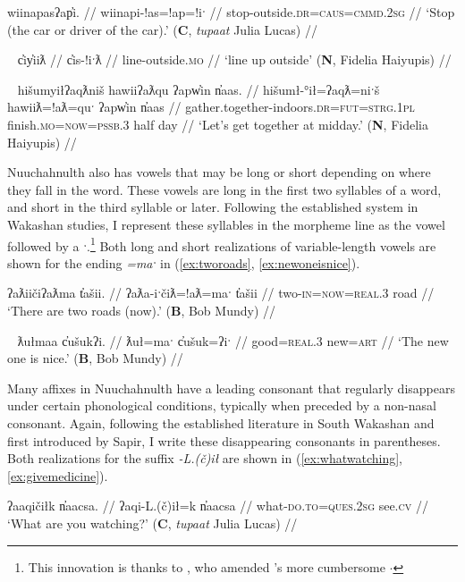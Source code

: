 \ex \label{ex:stopoutside}
\begingl
\glpreamble wiinapasʔap̓i. //
\gla wiinapi-!as=!ap=!iˑ //
\glb stop-outside.\textsc{dr}=\textsc{caus}=\textsc{cmmd.2sg} //
\glft `Stop (the car or driver of the car).' (\textbf{C}, \textit{tupaat} Julia Lucas) //
\endgl
\xe

\ex~ \label{ex:lineupoutside}
\begingl
\glpreamble c̓iy̓iiƛ //
\gla c̓is-!iˑƛ //
\glb line-outside.\textsc{mo} //
\glft `line up outside' (\textbf{N}, Fidelia Haiyupis) //
\endgl
\xe

\ex~ \label{ex:gatherindoors}
\begingl
\glpreamble hišumyiłʔaqƛniš hawiiʔaƛqu ʔapw̓in n̓aas. //
\gla hišumł-°ił=ʔaqƛ=niˑš hawiiƛ=!aƛ=quˑ ʔapw̓in n̓aas //
\glb gather.together-indoors.\textsc{dr}=\textsc{fut}=\textsc{strg.1pl} finish.\textsc{mo}=\textsc{now}=\textsc{pssb.3} half day //
\glft `Let's get together at midday.' (\textbf{N}, Fidelia Haiyupis) //
\endgl
\xe

Nuuchahnulth also has vowels that may be long or short depending on where they fall in the word. These vowels are long in the first two syllables of a word, and short in the third syllable or later. Following the established system in Wakashan studies, I represent these syllables in the morpheme line as the vowel followed by a ˑ.\footnote{This innovation is thanks to \citealt{rose1981}, who amended \citealt{sapir1939}'s more cumbersome \u{$\cdot$}} Both long and short realizations of variable-length vowels are shown for the ending \textit{=maˑ} in (\ref{ex:tworoads}, \ref{ex:newoneisnice}).

\ex \label{ex:tworoads}
\begingl
\glpreamble ʔaƛiičiʔaƛma t̓ašii. //
\gla ʔaƛa-iˑčiƛ=!aƛ=maˑ t̓ašii //
\glb two-\textsc{in}=\textsc{now}=\textsc{real.3} road //
\glft `There are two roads (now).' (\textbf{B}, Bob Mundy) //
\endgl
\xe

\ex~ \label{ex:newoneisnice}
\begingl
\glpreamble ƛułmaa c̓ušukʔi. //
\gla ƛuł=maˑ c̓ušuk=ʔiˑ //
\glb good=\textsc{real.3} new=\textsc{art} //
\glft `The new one is nice.' (\textbf{B}, Bob Mundy) //
\endgl
\xe

Many affixes in Nuuchahnulth have a leading consonant that regularly disappears under certain phonological conditions, typically when preceded by a non-nasal consonant. Again, following the established literature in South Wakashan and first introduced by Sapir, I write these disappearing consonants in parentheses. Both realizations for the suffix \textit{-L.(č)ił} are shown in (\ref{ex:whatwatching}, \ref{ex:givemedicine}).

\ex \label{ex:whatwatching}
\begingl
\glpreamble ʔaaqičiłk n̓aacsa. //
\gla ʔaqi-L.(č)ił=k n̓aacsa //
\glb what-\textsc{do.to}=\textsc{ques.2sg} see.\textsc{cv} //
\glft `What are you watching?' (\textbf{C}, \textit{tupaat} Julia Lucas) //
\endgl
\xe

